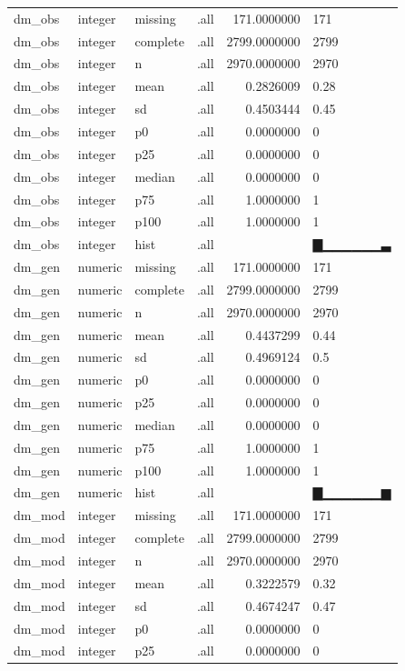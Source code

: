 \documentclass[]{msu-thesis}
\theoremstyle{definition}
\theoremstyle{definition}
\theoremstyle{definition}
\theoremstyle{remark}
\begin{document}
\begin{table}
{\begin{tabular}[t]{llllrl}
dm\_obs & integer & missing & .all & 171.0000000 & 171\\
dm\_obs & integer & complete & .all & 2799.0000000 & 2799\\
dm\_obs & integer & n & .all & 2970.0000000 & 2970\\
dm\_obs & integer & mean & .all & 0.2826009 & 0.28\\
dm\_obs & integer & sd & .all & 0.4503444 & 0.45\\
dm\_obs & integer & p0 & .all & 0.0000000 & 0\\
dm\_obs & integer & p25 & .all & 0.0000000 & 0\\
dm\_obs & integer & median & .all & 0.0000000 & 0\\
dm\_obs & integer & p75 & .all & 1.0000000 & 1\\
dm\_obs & integer & p100 & .all & 1.0000000 & 1\\
dm\_obs & integer & hist & .all &  & ▇▁▁▁▁▁▁▃\\
dm\_gen & numeric & missing & .all & 171.0000000 & 171\\
dm\_gen & numeric & complete & .all & 2799.0000000 & 2799\\
dm\_gen & numeric & n & .all & 2970.0000000 & 2970\\
dm\_gen & numeric & mean & .all & 0.4437299 & 0.44\\
dm\_gen & numeric & sd & .all & 0.4969124 & 0.5\\
dm\_gen & numeric & p0 & .all & 0.0000000 & 0\\
dm\_gen & numeric & p25 & .all & 0.0000000 & 0\\
dm\_gen & numeric & median & .all & 0.0000000 & 0\\
dm\_gen & numeric & p75 & .all & 1.0000000 & 1\\
dm\_gen & numeric & p100 & .all & 1.0000000 & 1\\
dm\_gen & numeric & hist & .all &  & ▇▁▁▁▁▁▁▆\\
dm\_mod & integer & missing & .all & 171.0000000 & 171\\
dm\_mod & integer & complete & .all & 2799.0000000 & 2799\\
dm\_mod & integer & n & .all & 2970.0000000 & 2970\\
dm\_mod & integer & mean & .all & 0.3222579 & 0.32\\
dm\_mod & integer & sd & .all & 0.4674247 & 0.47\\
dm\_mod & integer & p0 & .all & 0.0000000 & 0\\
dm\_mod & integer & p25 & .all & 0.0000000 & 0\\

\end{tabular}}
\end{table}
\end{document}

